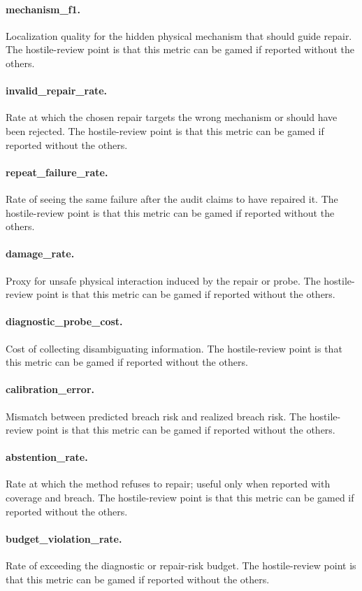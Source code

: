 \documentclass{article}
\begin{document}
\paragraph{mechanism\_f1.} Localization quality for the hidden physical mechanism that should guide repair. The hostile-review point is that this metric can be gamed if reported without the others.
\paragraph{invalid\_repair\_rate.} Rate at which the chosen repair targets the wrong mechanism or should have been rejected. The hostile-review point is that this metric can be gamed if reported without the others.
\paragraph{repeat\_failure\_rate.} Rate of seeing the same failure after the audit claims to have repaired it. The hostile-review point is that this metric can be gamed if reported without the others.
\paragraph{damage\_rate.} Proxy for unsafe physical interaction induced by the repair or probe. The hostile-review point is that this metric can be gamed if reported without the others.
\paragraph{diagnostic\_probe\_cost.} Cost of collecting disambiguating information. The hostile-review point is that this metric can be gamed if reported without the others.
\paragraph{calibration\_error.} Mismatch between predicted breach risk and realized breach risk. The hostile-review point is that this metric can be gamed if reported without the others.
\paragraph{abstention\_rate.} Rate at which the method refuses to repair; useful only when reported with coverage and breach. The hostile-review point is that this metric can be gamed if reported without the others.
\paragraph{budget\_violation\_rate.} Rate of exceeding the diagnostic or repair-risk budget. The hostile-review point is that this metric can be gamed if reported without the others.
\end{document}
